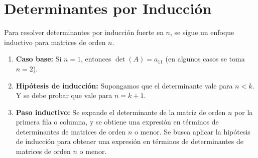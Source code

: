 \documentclass{article}
\begin{document}

\section*{Determinantes por Inducción}
Para resolver determinantes por inducción fuerte en $n$, se sigue un enfoque inductivo para matrices de orden $n$.
\begin{enumerate}
    \item \textbf{Caso base:} Si $n=1$, entonces $\det(A) = a_{11}$ (en algunos casos se toma $n=2$).
    \item \textbf{Hipótesis de inducción:} Supongamos que el determinante vale para $n<k$. Y se debe probar que vale para $n=k+1$.
    \item \textbf{Paso inductivo:} Se expande el determinante de la matriz de orden $n$ por la primera fila o columna, y se obtiene una expresión en términos de determinantes de matrices de orden $n$ o menor. Se busca aplicar la hipótesis de inducción para obtener una expresión en términos de determinantes de matrices de orden $n$ o menor.
\end{enumerate}
\end{document}
